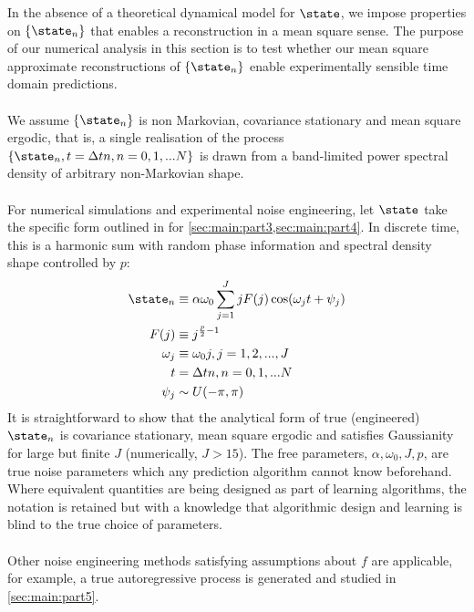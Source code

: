 In the absence of a theoretical dynamical model for $\state$, we impose properties on $\{ \state_n \}$ that enables a reconstruction in a mean square sense. The purpose of our numerical analysis in this section is to test whether our mean square approximate reconstructions of $\{ \state_n \}$ enable experimentally sensible time domain predictions. 
\\
\\
We assume $\{ \state_n \}$  is non Markovian, covariance stationary and mean square ergodic, that is, a single realisation of the process $\{ \state_n, t = \Delta t n, n = 0, 1, ... N\}$ is drawn from a band-limited power spectral density of arbitrary non-Markovian shape. 
\\
\\
For numerical simulations and experimental noise engineering, let $\state$ take the specific form outlined in \cite{soare2014} for \cref{sec:main:part3,sec:main:part4}. In discrete time, this is a harmonic sum with random phase information and spectral density shape controlled by $p$:
\begin{align}
\state_n &\equiv \alpha \omega_0 \sum_{j=1}^{J} j F(j)\cos(\omega_j t + \psi_j) \\
F(j) & \equiv j^{\frac{p}{2} -1}\\
\omega_j & \equiv \omega_0 j, j = 1, 2, ..., J \\
t &= \Delta t n,  n = 0, 1, ...N  \\ 
\psi_j & \sim U(-\pi, \pi) 
\end{align}
It is straightforward to show that the analytical form of true (engineered) $\state_n$ is covariance stationary, mean square ergodic and satisfies Gaussianity for large but finite $J$ (numerically, $J > 15$). The free parameters, $\alpha, \omega_0, J, p$, are true noise parameters which any prediction algorithm cannot know beforehand. Where equivalent quantities are being designed as part of learning algorithms, the notation is retained but with a knowledge that algorithmic design and learning is blind to the true choice of parameters. 
\\
\\
Other noise engineering methods satisfying assumptions about $f$ are applicable, for example, a true autoregressive process is generated and studied in \cref{sec:main:part5}.

